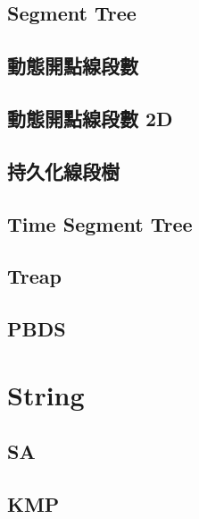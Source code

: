\subsection{Segment Tree}


\subsection{動態開點線段數}


\subsection{動態開點線段數 2D}


\subsection{持久化線段樹}


\subsection{Time Segment Tree}


\subsection{Treap}


\subsection{PBDS}


\section{String}

\subsection{SA}


\subsection{KMP}


